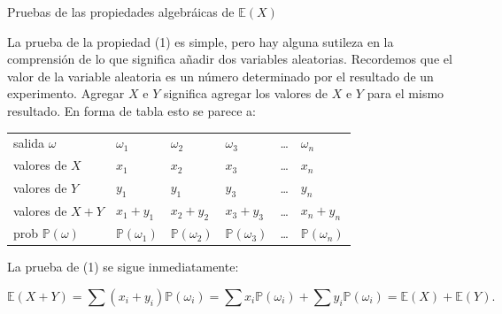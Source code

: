 \documentclass[10pt]{beamer}
\begin{document}
\begin{frame}{Pruebas de las propiedades algebr\'aicas de $\mathbb{E}(X)$}
\small{ La prueba de la propiedad (1) es simple, pero hay alguna sutileza en la comprensi\'on de lo que significa a\~nadir dos variables aleatorias. Recordemos que el valor de la variable aleatoria es un n\'umero determinado por el resultado de un experimento. Agregar $X$ e $Y$ significa agregar los valores de $X$ e $Y$ para el mismo resultado. En forma de tabla esto se parece a:
	
\begin{table}[]
	\centering
	\begin{tabular}{llllll}
		salida $\omega$           & $\omega_1$             & $\omega_2$             & $\omega_3$             & \dots & $\omega_n$             \\
		valores de $X$            & $x_1$                  & $x_2$                  & $x_3$                  & \dots & $x_n$                  \\
		valores de $Y$            & $y_1$                  & $y_1$                  & $y_3$                  & \dots & $y_n$                  \\
		valores de $X +Y$         & $x_1 + y_1$            & $x_2 + y_2$            & $x_3 + y_3$            & \dots & $x_n + y_n$            \\
		prob $\mathbb{P}(\omega)$ & $\mathbb{P}(\omega_1)$ & $\mathbb{P}(\omega_2)$ & $\mathbb{P}(\omega_3)$ & \dots & $\mathbb{P}(\omega_n)$
	\end{tabular}
\end{table}	

La prueba de (1) se sigue inmediatamente:

\[
\mathbb{E}(X + Y) = \sum(x_i + y_i)\mathbb{P}(\omega_i) = \sum x_i\mathbb{P}(\omega_i) + \sum y_i\mathbb{P}(\omega_i) = \mathbb{E}(X) + \mathbb{E}(Y).
\]
}
\end{frame}
\end{document}

